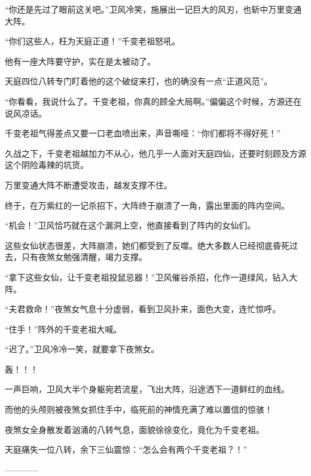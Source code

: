 \begin{this_body}
“你还是先过了眼前这关吧。”卫风冷笑，施展出一记巨大的风刃，也斩中万里变通大阵。

“你们这些人，枉为天庭正道！”千变老祖怒吼。

他有一座大阵要守护，实在是太被动了。

天庭四位八转专门盯着他的这个破绽来打，也的确没有一点“正道风范”。

“你看看，我说什么了。千变老祖，你真的顾全大局啊。”偏偏这个时候，方源还在说风凉话。

千变老祖气得差点又要一口老血喷出来，声音嘶哑：“你们都将不得好死！”

久战之下，千变老祖越加力不从心，他几乎一人面对天庭四仙，还要时刻顾及方源这个阴险毒辣的坑货。

万里变通大阵不断遭受攻击，越发支撑不住。

终于，在万紫红的一记杀招下，大阵终于崩溃了一角，露出里面的阵内空间。

“机会！”卫风恰巧就在这个漏洞上空，他直接看到了阵内的女仙们。

这些女仙状态很差，大阵崩溃，她们都受到了反噬。绝大多数人已经彻底昏死过去，只有夜煞女勉强清醒，竭力支撑。

“拿下这些女仙，让千变老祖投鼠忌器！”卫风催谷杀招，化作一道绿风，钻入大阵。

“夫君救命！”夜煞女气息十分虚弱，看到卫风扑来，面色大变，连忙惊呼。

“住手！”阵外的千变老祖大喊。

“迟了。”卫风冷冷一笑，就要拿下夜煞女。

轰！！！

一声巨响，卫风大半个身躯宛若流星，飞出大阵，沿途洒下一道鲜红的血线。

而他的头颅则被夜煞女抓住手中，临死前的神情充满了难以置信的惊骇！

夜煞女全身散发着汹涌的八转气息，面貌徐徐变化，竟化为千变老祖。

天庭痛失一位八转，余下三仙震惊：“怎么会有两个千变老祖？！”

------------

\end{this_body}

